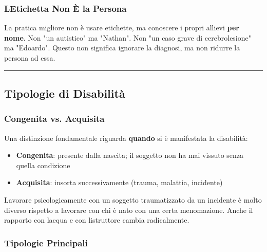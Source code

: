\documentclass[a4paper,11pt]{article}
\providecommand{\tightlist}{%
  \setlength{\itemsep}{0pt}\setlength{\parskip}{0pt}}
\begin{document}
\subsubsection{L\textquotesingle Etichetta Non È la
      Persona}\label{letichetta-non-uxe8-la-persona}

La pratica migliore non è usare etichette, ma conoscere i propri allievi
\textbf{per nome}. Non "un autistico" ma "Nathan". Non "un caso grave di
cerebrolesione" ma "Edoardo". Questo non significa ignorare la diagnosi,
ma non ridurre la persona ad essa.

\begin{center}\rule{0.5\linewidth}{0.5pt}\end{center}

\subsection{Tipologie di Disabilità}\label{tipologie-di-disabilituxe0}

\subsubsection{Congenita vs. Acquisita}\label{congenita-vs.-acquisita}

Una distinzione fondamentale riguarda \textbf{quando} si è manifestata
la disabilità:

\begin{itemize}
      \tightlist
      \item
            \textbf{Congenita}: presente dalla nascita; il soggetto non ha mai
            vissuto senza quella condizione
      \item
            \textbf{Acquisita}: insorta successivamente (trauma, malattia,
            incidente)
\end{itemize}

Lavorare psicologicamente con un soggetto traumatizzato da un incidente
è molto diverso rispetto a lavorare con chi è nato con una certa
menomazione. Anche il rapporto con l\textquotesingle acqua e con
l\textquotesingle istruttore cambia radicalmente.

\subsubsection{Tipologie Principali}\label{tipologie-principali}
\end{document}
